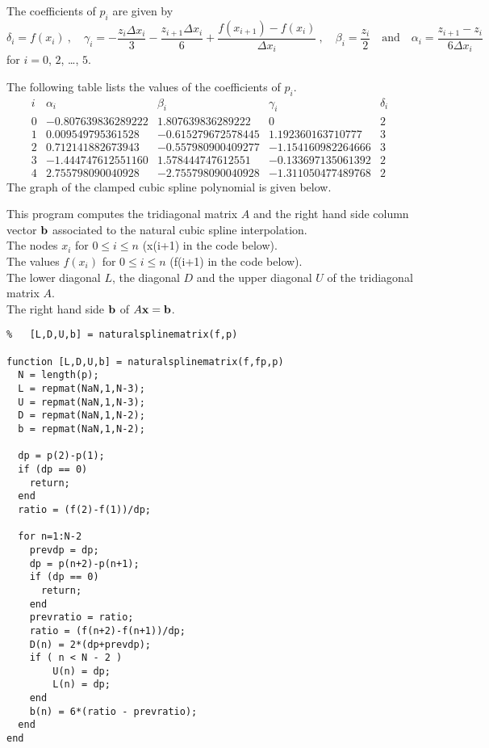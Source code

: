 {The coefficients of $p_i$ are given by
\[
\delta_i = f(x_i)  \ , \quad
\gamma_i = -\frac{z_i \Delta x_i}{3} - \frac{z_{i+1} \Delta x_i}{6} +
\frac{f(x_{i+1})-f(x_i)}{\Delta x_i}  \ , \quad
\beta_i = \frac{z_i}{2} \quad \text{and} \quad
\alpha_i = \frac{z_{i+1}-z_i}{6 \Delta x_i}
\]
for $i=0$, $2$, \ldots, $5$.

The following table lists the values of the coefficients of
$p_i$.
\[
\begin{array}{c|cccc}
i & \alpha_i & \beta_i & \gamma_i & \delta_i \\
\hline
0 & -0.807639836289222 & 1.807639836289222 & 0 & 2 \\
1 & 0.009549795361528 & -0.615279672578445 & 1.192360163710777 & 3 \\
2 & 0.712141882673943 & -0.557980900409277 & -1.154160982264666 & 3 \\
3 & -1.444747612551160 & 1.578444747612551 & -0.133697135061392 & 2 \\
4 & 2.755798090040928 & -2.755798090040928 & -1.311050477489768 & 2
\end{array}
\]
The graph of the clamped cubic spline polynomial is given below.
}

  
\begin{code} \label{codeNCSI}
This program computes the tridiagonal matrix $A$ and the right hand
side column vector $\mathbf{b}$ associated to the natural cubic spline
interpolation.\\
 The nodes $x_i$ for $0 \leq i \leq n$ (x(i+1) in the code
below).\\
The values $f(x_i)$ for $0 \leq i \leq n$ (f(i+1) in the code
below).\\
 The lower diagonal $L$, the diagonal $D$ and the upper
diagonal $U$ of the tridiagonal matrix $A$.\\
The right hand side $\mathbf{b}$ of $A\mathbf{x} = \mathbf{b}$.
\small
\begin{verbatim}
%   [L,D,U,b] = naturalsplinematrix(f,p)

function [L,D,U,b] = naturalsplinematrix(f,fp,p)
  N = length(p);
  L = repmat(NaN,1,N-3);
  U = repmat(NaN,1,N-3);
  D = repmat(NaN,1,N-2);
  b = repmat(NaN,1,N-2);

  dp = p(2)-p(1);
  if (dp == 0)
    return;
  end
  ratio = (f(2)-f(1))/dp;

  for n=1:N-2
    prevdp = dp;
    dp = p(n+2)-p(n+1);
    if (dp == 0)
      return;
    end
    prevratio = ratio;
    ratio = (f(n+2)-f(n+1))/dp;
    D(n) = 2*(dp+prevdp);
    if ( n < N - 2 )
        U(n) = dp;
        L(n) = dp;
    end
    b(n) = 6*(ratio - prevratio);
  end
end
\end{verbatim}
\end{code}

